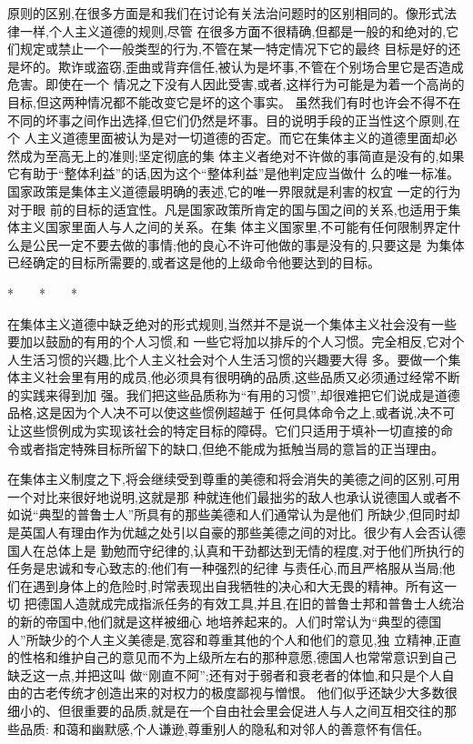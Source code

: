 ﻿\documentclass[12pt]{article}
\begin{document}
原则的区别,在很多方面是和我们在讨论有关法治问题时的区别相同的。像形式法律一样,个人主义道德的规则,尽管
在很多方面不很精确,但都是一般的和绝对的,它们规定或禁止一个一般类型的行为,不管在某一特定情况下它的最终
目标是好的还是坏的。欺诈或盗窃,歪曲或背弃信任,被认为是坏事,不管在个别场合里它是否造成危害。即使在一个
情况之下没有人因此受害,或者,这样行为可能是为着一个高尚的目标,但这两种情况都不能改变它是坏的这个事实。
虽然我们有时也许会不得不在不同的坏事之间作出选择,但它们仍然是坏事。目的说明手段的正当性这个原则,在个
人主义道德里面被认为是对一切道德的否定。而它在集体主义的道德里面却必然成为至高无上的准则;坚定彻底的集
体主义者绝对不许做的事简直是没有的,如果它有助于``整体利益''的话,因为这个``整体利益''是他判定应当做什
么的唯一标准。国家政策是集体主义道德最明确的表述,它的唯一界限就是利害的权宜 \myrule 一定的行为对于眼
前的目标的适宜性。凡是国家政策所肯定的国与国之间的关系,也适用于集体主义国家里面人与人之间的关系。在集
体主义国家里,不可能有任何限制界定什么是公民一定不要去做的事情;他的良心不许可他做的事是没有的,只要这是
为集体已经确定的目标所需要的,或者这是他的上级命令他要达到的目标。

*　　*　　*

在集体主义道德中缺乏绝对的形式规则,当然并不是说一个集体主义社会没有一些要加以鼓励的有用的个人习惯,和
一些它将加以排斥的个人习惯。完全相反,它对个人生活习惯的兴趣,比个人主义社会对个人生活习惯的兴趣要大得
多。要做一个集体主义社会里有用的成员,他必须具有很明确的品质,这些品质又必须通过经常不断的实践来得到加
强。我们把这些品质称为``有用的习惯'',却很难把它们说成是道德品格,这是因为个人决不可以使这些惯例超越于
任何具体命令之上,或者说,决不可让这些惯例成为实现该社会的特定目标的障碍。它们只适用于填补一切直接的命
令或者指定特殊目标所留下的缺口,但绝不能成为抵触当局的意旨的正当理由。

在集体主义制度之下,将会继续受到尊重的美德和将会消失的美德之间的区别,可用一个对比来很好地说明,这就是那
种就连他们最拙劣的敌人也承认说德国人或者不如说``典型的普鲁士人''所具有的那些美德和人们通常认为是他们
所缺少,但同时却是英国人有理由作为优越之处引以自豪的那些美德之间的对比。很少有人会否认德国人在总体上是
勤勉而守纪律的,认真和干劲都达到无情的程度,对于他们所执行的任务是忠诚和专心致志的;他们有一种强烈的纪律
与责任心,而且严格服从当局;他们在遇到身体上的危险时,时常表现出自我牺牲的决心和大无畏的精神。所有这一切
把德国人造就成完成指派任务的有效工具,并且,在旧的普鲁士邦和普鲁士人统治的新的帝国中,他们就是这样被细心
地培养起来的。人们时常认为``典型的德国人''所缺少的个人主义美德是,宽容和尊重其他的个人和他们的意见,独
立精神,正直的性格和维护自己的意见而不为上级所左右的那种意愿,德国人也常常意识到自己缺乏这一点,并把这叫
做``刚直不阿'';还有对于弱者和衰老者的体恤,和只是个人自由的古老传统才创造出来的对权力的极度鄙视与憎恨。
他们似乎还缺少大多数很细小的、但很重要的品质,就是在一个自由社会里会促进人与人之间互相交往的那些品质:
和蔼和幽默感,个人谦逊,尊重别人的隐私和对邻人的善意怀有信任。
\end{document}
